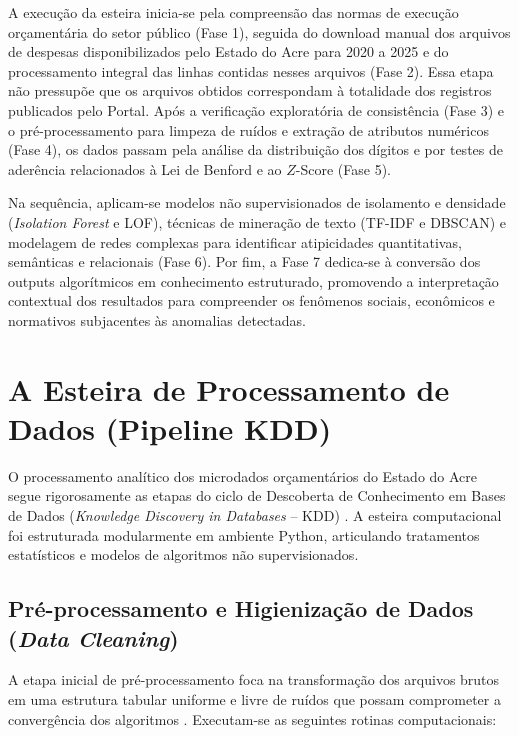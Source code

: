 \documentclass[
    12pt,               %
    openright,          %
    oneside,            %
    a4paper,            %
    chapter=TITLE,      %
    sumario=tradicional,%
    english,            %
    brazilian,          %
 ]{abntex2}
\begin{document}
A execução da esteira inicia-se pela compreensão das normas de execução orçamentária do setor público (Fase 1), seguida do download manual dos arquivos de despesas disponibilizados pelo Estado do Acre para 2020 a 2025 e do processamento integral das linhas contidas nesses arquivos (Fase 2). Essa etapa não pressupõe que os arquivos obtidos correspondam à totalidade dos registros publicados pelo Portal. Após a verificação exploratória de consistência (Fase 3) e o pré-processamento para limpeza de ruídos e extração de atributos numéricos (Fase 4), os dados passam pela análise da distribuição dos dígitos e por testes de aderência relacionados à Lei de Benford e ao $Z$-Score (Fase 5).

Na sequência, aplicam-se modelos não supervisionados de isolamento e densidade (\textit{Isolation Forest} e LOF), técnicas de mineração de texto (TF-IDF e DBSCAN) e modelagem de redes complexas para identificar atipicidades quantitativas, semânticas e relacionais (Fase 6). Por fim, a Fase 7 dedica-se à conversão dos outputs algorítmicos em conhecimento estruturado, promovendo a interpretação contextual dos resultados para compreender os fenômenos sociais, econômicos e normativos subjacentes às anomalias detectadas.

\section{A Esteira de Processamento de Dados (Pipeline KDD)}\label{sec:pipeline_kdd}

O processamento analítico dos microdados orçamentários do Estado do Acre segue rigorosamente as etapas do ciclo de Descoberta de Conhecimento em Bases de Dados (\textit{Knowledge Discovery in Databases} -- KDD) \cite{goldschmidt2005, pereira2025}. A esteira computacional foi estruturada modularmente em ambiente Python, articulando tratamentos estatísticos e modelos de algoritmos não supervisionados.

\subsection{Pré-processamento e Higienização de Dados (\textit{Data Cleaning})}\label{subsec:limpeza_dados}

A etapa inicial de pré-processamento foca na transformação dos arquivos brutos em uma estrutura tabular uniforme e livre de ruídos que possam comprometer a convergência dos algoritmos \cite{goldschmidt2005}. Executam-se as seguintes rotinas computacionais:
\end{document}
